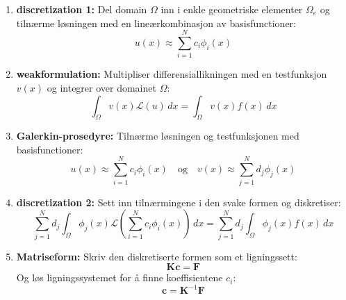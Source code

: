 \begin{enumerate}
    \item \textbf{discretization 1:} Del domain \( \Omega \) inn i enkle geometriske elementer \( \Omega_e \) og tilnærme løsningen med en lineærkombinasjon av basisfunctioner:
          \[
              u(x) \approx \sum_{i=1}^N c_i \phi_i(x)
          \]
    \item \textbf{weakformulation:} Multipliser differensiallikningen med en testfunksjon \( v(x) \) og integrer over domainet \( \Omega \):
          \[
              \int_\Omega v(x) \mathcal{L}(u) \, dx = \int_\Omega v(x) f(x) \, dx
          \]

    \item \textbf{Galerkin-prosedyre:} Tilnærme løsningen og testfunksjonen med basisfunctioner:
          \[
              u(x) \approx \sum_{i=1}^N c_i \phi_i(x) \quad \text{og} \quad v(x) \approx \sum_{j=1}^N d_j \phi_j(x)
          \]
    \item \textbf{discretization 2:} Sett inn tilnærmingene i den svake formen og diskretiser:
          \[
              \sum_{j=1}^N d_j \int_\Omega \phi_j(x) \mathcal{L} \left( \sum_{i=1}^N c_i \phi_i(x) \right) \, dx = \sum_{j=1}^N d_j \int_\Omega \phi_j(x) f(x) \, dx
          \]
    \item \textbf{Matriseform:} Skriv den diskretiserte formen som et ligningssett:
          \[
              \symbf{K} \symbf{c} = \symbf{F}
          \]
          Og løs ligningssystemet for å finne koeffisientene \(c_i\):
          \[
              \symbf{c} = \symbf{K}^{-1} \symbf{F}
          \]
\end{enumerate}


